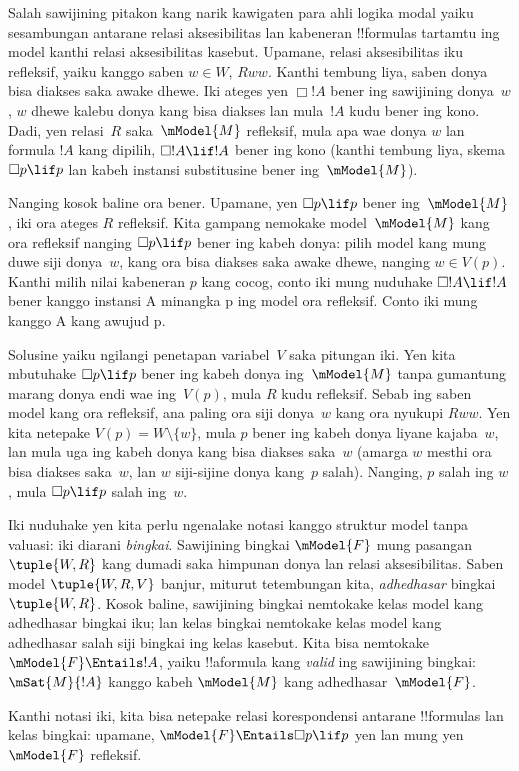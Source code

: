 \documentclass[../../../include/open-logic-section]{subfiles}
\begin{document}


Salah sawijining pitakon kang narik kawigaten para ahli logika
modal yaiku sesambungan antarane relasi aksesibilitas lan kabeneran
!!{formula}s tartamtu ing model kanthi relasi aksesibilitas kasebut.
Upamane, relasi aksesibilitas iku refleksif, yaiku kanggo saben $w
\in W$, $Rww$. Kanthi tembung liya, saben donya bisa diakses saka
awake dhewe. Iki ateges yen $\Box !A$ bener ing sawijining donya~$w$,
$w$ dhewe kalebu donya kang bisa diakses lan mula~$!A$ kudu bener
ing kono. Dadi, yen relasi~$R$ saka~$\mModel{M}$ refleksif, mula
apa wae donya $w$ lan formula $!A$ kang dipilih, $\Box !A
\lif !A$ bener ing kono (kanthi tembung liya, skema $\Box p \lif
p$ lan kabeh instansi substitusine bener ing~$\mModel{M}$).

Nanging kosok baline ora bener. Upamane, yen
$\Box p \lif p$ bener ing~$\mModel{M}$, iki ora ateges $R$ refleksif.
Kita gampang nemokake model~$\mModel{M}$ kang ora refleksif nanging
$\Box p \lif p$ bener ing kabeh donya: pilih model kang mung duwe
siji donya~$w$, kang ora bisa diakses saka awake dhewe, nanging
$w \in V(p)$. Kanthi milih nilai kabeneran $p$ kang cocog, conto iki mung
nuduhake $\Box !A \lif !A$ bener kanggo instansi A minangka p ing model ora refleksif. Conto iki mung kanggo A kang awujud p.

Solusine yaiku ngilangi penetapan variabel~$V$ saka
pitungan iki. Yen kita mbutuhake $\Box p \lif p$ bener ing kabeh donya
ing~$\mModel{M}$ tanpa gumantung marang donya endi wae ing~$V(p)$,
mula $R$ kudu refleksif. Sebab ing saben model kang ora refleksif,
ana paling ora siji donya~$w$ kang ora nyukupi $Rww$. Yen kita netepake
$V(p) = W \setminus \{w\}$, mula $p$ bener ing kabeh donya liyane
kajaba~$w$, lan mula uga ing kabeh donya kang bisa diakses saka~$w$
(amarga $w$ mesthi ora bisa diakses saka~$w$, lan $w$ siji-sijine
donya kang~$p$ salah). Nanging, $p$ salah ing $w$, mula $\Box
p \lif p$ salah ing~$w$.

Iki nuduhake yen kita perlu ngenalake notasi kanggo struktur
model tanpa valuasi: iki diarani \emph{bingkai}. Sawijining bingkai
$\mModel{F}$ mung pasangan $\tuple{W, R}$ kang dumadi saka himpunan
donya lan relasi aksesibilitas. Saben model $\tuple{W, R, V}$ banjur,
miturut tetembungan kita, \emph{adhedhasar} bingkai $\tuple{W, R}$.
Kosok baline, sawijining bingkai nemtokake kelas model kang adhedhasar
bingkai iku; lan kelas bingkai nemtokake kelas model kang adhedhasar
salah siji bingkai ing kelas kasebut. Kita bisa nemtokake
$\mModel{F} \Entails !A$, yaiku !!a{formula} kang \emph{valid} ing
sawijining bingkai: $\mSat{M}{!A}$ kanggo kabeh $\mModel{M}$ kang
adhedhasar~$\mModel{F}$.

Kanthi notasi iki, kita bisa netepake relasi korespondensi
antarane !!{formula}s lan kelas bingkai: upamane,
$\mModel{F} \Entails \Box p \lif p$ yen lan mung yen $\mModel{F}$ refleksif.
\end{document}
